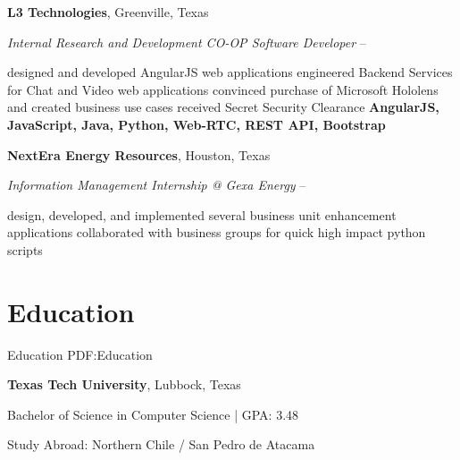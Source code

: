 \documentclass[a4paper,10pt,oneside]{article}
\begin{document}
\begin{body}
\begin{detail}
\end{detail}
\SmallEntryGap
\SmallEntryGap


{\textbf{L3 Technologies}},
Greenville, Texas
\par
\Item
\textit{Internal Research and Development CO-OP Software Developer}
\hfill
{} --
\begin{detail}
\BulletItem
designed and developed AngularJS web applications
\BulletItem
engineered Backend Services for Chat and Video web applications
\BulletItem
convinced purchase of Microsoft Hololens and created business use cases
\BulletItem
received Secret Security Clearance
\Item
\textbf{AngularJS, JavaScript, Java, Python, Web-RTC, REST API, Bootstrap}

\end{detail}
\SmallEntryGap
\SmallEntryGap

{\textbf{NextEra Energy Resources}},
Houston, Texas
\par
\Item
\textit{Information Management Internship @ Gexa Energy}
\hfill
{} --
\begin{detail}
\BulletItem
design, developed, and implemented several business unit enhancement applications
\BulletItem
collaborated with business groups for quick high impact python scripts
\end{detail}
\SmallEntryGap
\SmallEntryGap



\section
{Education}
{Education}
{PDF:Education}


{\textbf{Texas Tech University}},
Lubbock, Texas

\SmallEntryGap
Bachelor of Science in Computer Science  | GPA: 3.48
\hfill
\DatestampYMD{}{}{}
\begin{detail}
\Item
Study Abroad: Northern Chile / San Pedro de Atacama
\end{detail}



\end{body}
\end{document}

